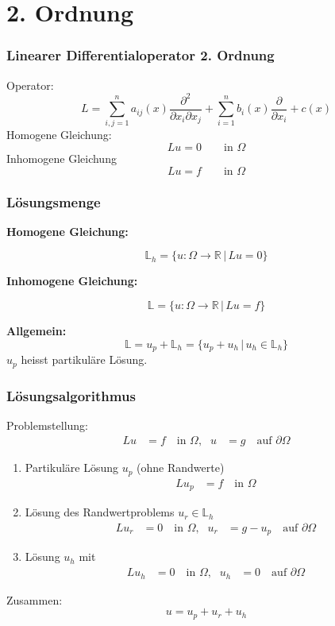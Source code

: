 %
%
%

\section{2. Ordnung}

\begin{frame}
\frametitle{Linearer Differentialoperator 2. Ordnung}
Operator:
\[
L
=
\sum_{i,j=1}^n a_{ij}(x)\frac{\partial^2}{\partial x_i\partial x_j}
+
\sum_{i=1}^n b_i(x)\frac{\partial}{\partial x_i}
+
c(x)
\]
Homogene Gleichung:
\[
Lu=0\qquad\text{in $\Omega$}
\]
Inhomogene Gleichung
\[
Lu=f\qquad\text{in $\Omega$}
\]
\end{frame}

\begin{frame}
\frametitle{Lösungsmenge}
{\bf Homogene Gleichung:}

\[
{\mathbb L}_h
=\{
u\colon \Omega\to \mathbb R\,|\, Lu=0
\}
\]

\bigskip

{\bf Inhomogene Gleichung:}

\[
{\mathbb L}
=\{
u\colon \Omega\to \mathbb R\,|\, Lu=f
\}
\]

{\bf Allgemein:}
\[
{\mathbb L} = u_p + {\mathbb L}_h
=\{u_p+u_h\,|\,u_h\in\mathbb L_h\}
\]
$u_p$ heisst partikuläre Lösung.

\end{frame}

\begin{frame}
\frametitle{Lösungsalgorithmus}
Problemstellung:
\begin{align*}
Lu&=f\quad\text{in $\Omega$,}
&
 u&=g\quad\text{auf $\partial\Omega$}
\end{align*}

\begin{enumerate}
\item Partikuläre Lösung $u_p$ (ohne Randwerte)
\begin{align*}
Lu_p&=f\quad\text{in $\Omega$}
\end{align*}
\item
Lösung des Randwertproblems $u_r\in\mathbb L_h$
\begin{align*}
Lu_r&=0    \quad\text{in $\Omega$,}&
 u_r&=g-u_p\quad\text{auf $\partial\Omega$}
\end{align*}
\item
Lösung $u_h$ mit
\begin{align*}
Lu_h&=0\quad\text{in $\Omega$,}
&
 u_h&=0\quad\text{auf $\partial\Omega$}
\end{align*}
\end{enumerate}
Zusammen:
\[
u = u_p+u_r+u_h
\]
\end{frame}

